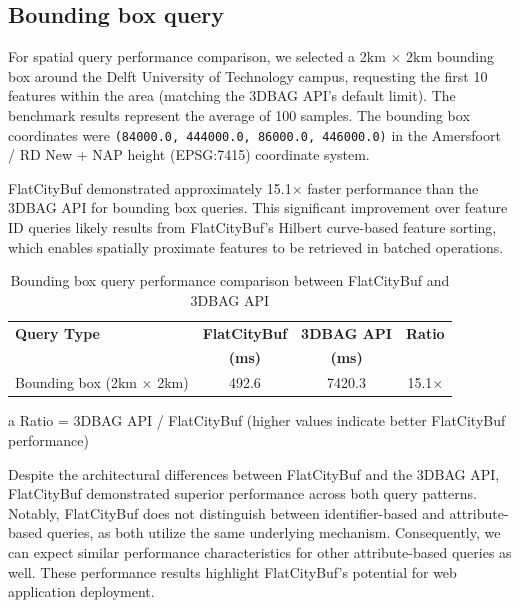 \subsection{Bounding box query}
\label{result:benchmark_over_the_web:bounding_box_query}

For spatial query performance comparison, we selected a 2km $\times$ 2km bounding box around the Delft University of Technology campus, requesting the first 10 features within the area (matching the 3DBAG API's default limit). The benchmark results represent the average of 100 samples. The bounding box coordinates were \texttt{(84000.0, 444000.0, 86000.0, 446000.0)} in the Amersfoort / RD New + NAP height (EPSG:7415) coordinate system.

FlatCityBuf demonstrated approximately 15.1$\times$ faster performance than the 3DBAG API for bounding box queries. This significant improvement over feature ID queries likely results from FlatCityBuf's Hilbert curve-based feature sorting, which enables spatially proximate features to be retrieved in batched operations.

\begin{table}[ht]
  \centering
  \caption{Bounding box query performance comparison between FlatCityBuf and 3DBAG API}
  \label{tab:bounding_box_performance}
  \begin{tabular}{lccc}
    \toprule
    \textbf{Query Type} & \textbf{FlatCityBuf} & \textbf{3DBAG API} & \textbf{Ratio\tnote{a}} \\
    & \textbf{(ms)} & \textbf{(ms)} & \\
    \midrule
    Bounding box (2km $\times$ 2km) & 492.6 & 7420.3 & 15.1$\times$ \\
    \bottomrule
  \end{tabular}
  \begin{tablenotes}[flushleft]
    \footnotesize
  \item[a] Ratio = 3DBAG API / FlatCityBuf (higher values indicate better FlatCityBuf performance)
  \end{tablenotes}
\end{table}

Despite the architectural differences between FlatCityBuf and the 3DBAG API, FlatCityBuf demonstrated superior performance across both query patterns. Notably, FlatCityBuf does not distinguish between identifier-based and attribute-based queries, as both utilize the same underlying mechanism. Consequently, we can expect similar performance characteristics for other attribute-based queries as well. These performance results highlight FlatCityBuf's potential for web application deployment.